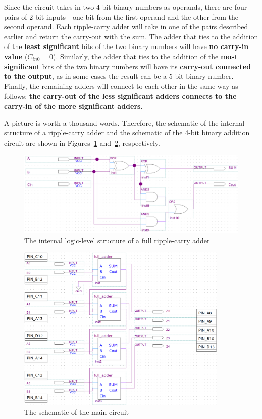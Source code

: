 \documentclass[12pt]{article}
\begin{document}
Since the circuit takes in two 4-bit binary numbers as operands, there are four pairs of 2-bit inputs---one bit from the first operand and the other from the second operand. Each ripple-carry adder will take in one of the pairs described earlier and return the carry-out with the sum. The adder that ties to the addition of the \textbf{least significant} bits of the two binary numbers will have \textbf{no carry-in value} ($C_{in0} = 0$). Similarly, the adder that ties to the addition of the \textbf{most significant} bits of the two binary numbers will have its \textbf{carry-out connected to the output}, as in some cases the result can be a 5-bit binary number. Finally, the remaining adders will connect to each other in the same way as follows: \textbf{the carry-out of the less significant adders connects to the carry-in of the more significant adders}.

A picture is worth a thousand words. Therefore, the schematic of the internal structure of a ripple-carry adder and the schematic of the 4-bit binary addition circuit are shown in Figures~\ref{figure:2} and~\ref{figure:3}, respectively.

\begin{figure}
  \centering
  \includegraphics[width=\textwidth]{full_adder_schematic.png}
  \caption{The internal logic-level structure of a full ripple-carry adder}
  \label{figure:2}
\end{figure}

\begin{figure}
  \centering
  \includegraphics[width=0.9\textwidth]{schematic.png}
  \caption{The schematic of the main circuit}
  \label{figure:3}
\end{figure}
\end{document}
